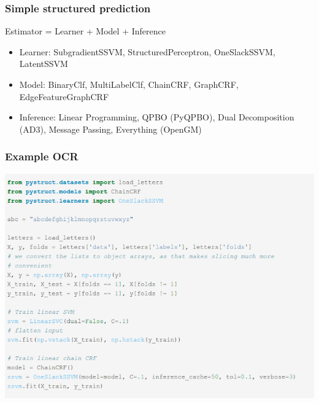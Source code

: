 \documentclass[final,ignorenonframetext,compress]{beamer}
\begin{document}
    \begin{frame}
        \frametitle{Simple structured prediction}
        Estimator = Learner + Model + Inference\\

        \begin{itemize}
            \item<2-> Learner: SubgradientSSVM, StructuredPerceptron, OneSlackSSVM, LatentSSVM
            \item<2-> Model: BinaryClf, MultiLabelClf, ChainCRF, GraphCRF, EdgeFeatureGraphCRF
            \item<2-> Inference: Linear Programming, QPBO (PyQPBO), Dual Decomposition (AD3), Message Passing, Everything (OpenGM)
        \end{itemize}

    \end{frame}

    \begin{frame}
        \frametitle{Example OCR}
        \includegraphics[width=.7\linewidth]{images/code_letters}
    \end{frame}
\end{document}
